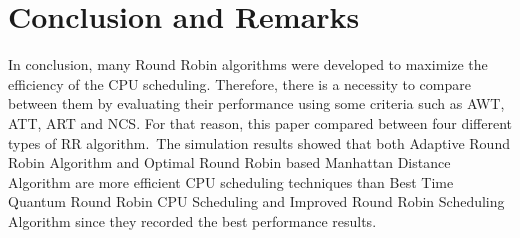 \documentclass[conference]{IEEEtran}
\begin{document}
    \section{Conclusion and Remarks}
    \label{sec:conclusion-and-remarks}
    In conclusion, many Round Robin algorithms were
    developed to maximize the efficiency of the CPU scheduling.
    Therefore, there is a necessity to compare between them by
    evaluating their performance using some criteria such as AWT,
    ATT, ART and NCS. For that reason, this paper compared
    between four different types of RR algorithm.~The simulation
    results showed that both Adaptive Round Robin Algorithm and
    Optimal Round Robin based Manhattan Distance Algorithm
    are more efficient CPU scheduling techniques than Best Time
    Quantum Round Robin CPU Scheduling and Improved Round
    Robin Scheduling Algorithm since they recorded the best
    performance results.

    
    
\end{document}

